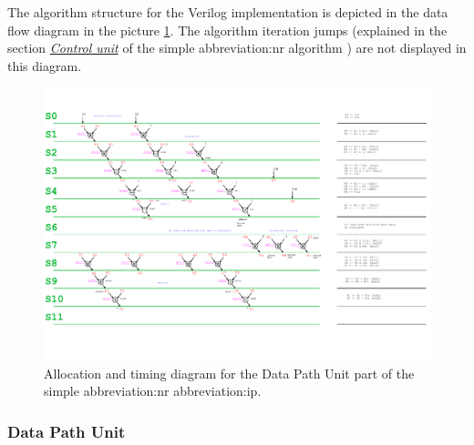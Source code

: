 \documentclass[a4paper, twoside, 11pt]{article}
\newcommand{\fbar}{\FloatBarrier}
\begin{document}
            The algorithm structure for the Verilog implementation is depicted in the data flow diagram in the picture \ref{fig:simple-nr-allocation-timing}. The algorithm iteration jumps (explained in the section \hyperref[subsubsec:simple-nr-control-unit]{\textit{Control unit}} of the simple \gls{abbreviation:nr} algorithm ) are not displayed in this diagram.
            \begin{figure}[htbp!]
                \centering
                \includegraphics[width=1\textwidth]{src/pdf/simple-nr-allocation-timing.pdf}
                \caption{Allocation and timing diagram for the Data Path Unit part of the simple \gls{abbreviation:nr} \gls{abbreviation:ip}.}
                \label{fig:simple-nr-allocation-timing}
            \end{figure}

        \fbar
        \subsubsection{Data Path Unit}
\end{document}
